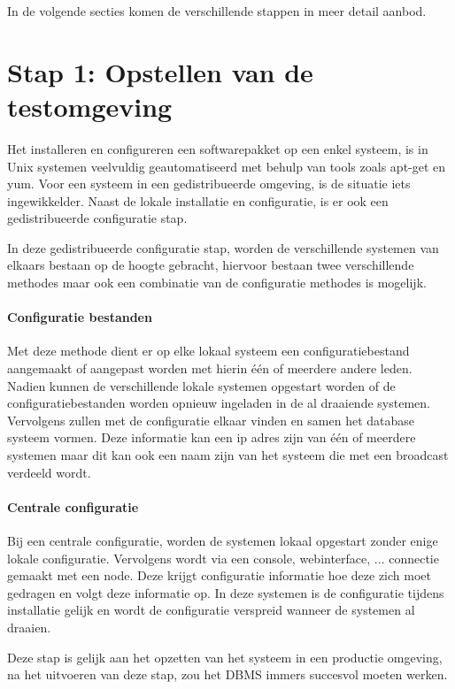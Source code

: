 In de volgende secties komen de verschillende stappen in meer detail aanbod.  

\section{Stap 1: Opstellen van de testomgeving}
Het installeren en configureren een softwarepakket op een enkel systeem, is in Unix systemen veelvuldig geautomatiseerd met behulp van tools zoals \gls{apt-get} en \gls{yum}. Voor een systeem in een gedistribueerde omgeving, is de situatie iets ingewikkelder. Naast de lokale installatie en configuratie, is er ook een gedistribueerde configuratie stap.  

In deze gedistribueerde configuratie stap, worden de verschillende systemen van elkaars bestaan op de hoogte gebracht, hiervoor bestaan twee verschillende methodes maar ook een combinatie van de configuratie methodes is mogelijk.
 
\paragraph{Configuratie bestanden} Met deze methode dient er op elke lokaal systeem een configuratiebestand aangemaakt of aangepast worden met hierin één of meerdere andere leden. Nadien kunnen de verschillende lokale systemen opgestart worden of de configuratiebestanden worden opnieuw ingeladen in de al draaiende systemen. Vervolgens zullen met de configuratie elkaar vinden en samen het database systeem vormen. Deze informatie kan een ip adres zijn van één of meerdere systemen maar dit kan ook een naam zijn van het systeem die met een broadcast verdeeld wordt. 
\paragraph{Centrale configuratie} Bij een centrale configuratie, worden de systemen lokaal opgestart zonder enige lokale configuratie. Vervolgens wordt via een console, webinterface, ... connectie gemaakt met een node. Deze krijgt configuratie informatie hoe deze zich moet gedragen en volgt deze informatie op. In deze systemen is de configuratie tijdens installatie gelijk en wordt de configuratie verspreid wanneer de systemen al draaien.  


Deze stap is gelijk aan het opzetten van het systeem in een productie omgeving, na het uitvoeren van deze stap, zou het \gls{DBMS} immers succesvol moeten werken. 

